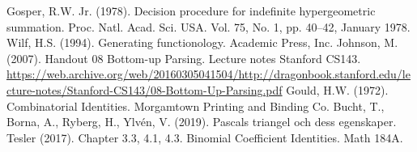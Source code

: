 Gosper, R.W. Jr. (1978). Decision procedure for indefinite hypergeometric summation. Proc. Natl. Acad. Sci. USA. Vol. 75, No. 1, pp. 40--42, January 1978.\label{Ref: gosper}
Wilf, H.S. (1994). Generating functionology. Academic Press, Inc.\label{Ref: wilf}
Johnson, M. (2007). Handout 08 Bottom-up Parsing. Lecture notes Stanford CS143. \url{https://web.archive.org/web/20160305041504/http://dragonbook.stanford.edu/lecture-notes/Stanford-CS143/08-Bottom-Up-Parsing.pdf}\label{Ref: parser}
Gould, H.W. (1972). Combinatorial Identities. Morgamtown Printing and Binding Co.\label{Ref: gould}
Bucht, T., Borna, A., Ryberg, H., Ylvén, V. (2019). Pascals triangel och dess egenskaper.\label{Ref: bucht}
Tesler (2017). Chapter 3.3, 4.1, 4.3. Binomial Coefficient Identities. Math 184A.\label{Ref: tesler}
